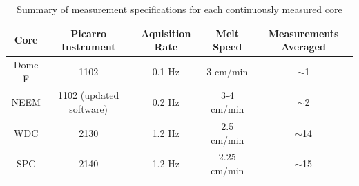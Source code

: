 \documentclass[draft, jgrga]{AGUTeX}
\begin{document}
\begin{table}
  \label{picarro_table}
\caption{Summary of measurement specifications for each continuously measured core}
\centering
\begin{tabular}{|c | c c c c|}
\hline
Core  & Picarro Instrument & Aquisition Rate & Melt Speed & Measurements Averaged \\
\hline
Dome F  & 1102 & 0.1 Hz & 3 cm/min & $\sim$1   \\
NEEM & 1102 (updated software) & 0.2 Hz & 3-4 cm/min & $\sim$2   \\
WDC & 2130 & 1.2 Hz & 2.5 cm/min & $\sim$14   \\
SPC & 2140 & 1.2 Hz & 2.25 cm/min & $\sim$15   \\
\hline
\end{tabular}
\end{table}
\end{document}
